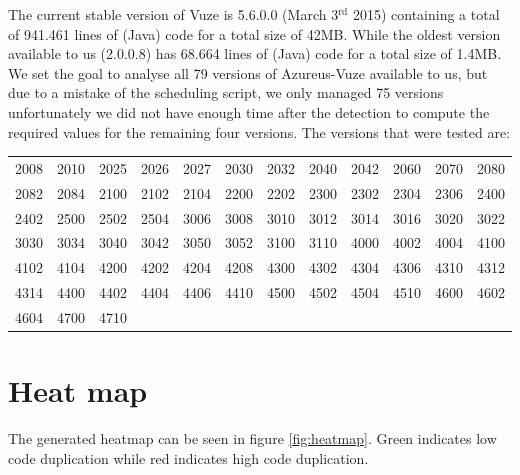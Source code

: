 \documentclass[a4paper,twoside,11pt]{article}
\begin{document}
The current stable version of {\sc Vuze} is 5.6.0.0 (March 3$^{\text{rd}}$ 2015) containing a total of 941.461 lines of (Java) code for a total size of 42MB. While the oldest version available to us (2.0.0.8) has 68.664 lines of (Java) code for a total size of 1.4MB. \\

We set the goal to analyse all 79 versions of {\sc Azureus-Vuze} available to us, but due to a mistake of the scheduling script, we only managed 75 versions unfortunately we did not have enough time after the detection to compute the required values for the remaining four versions. The versions that were tested are: \\

\begin{tabular}{cccccccccccc}
2008 & 2010 & 2025 & 2026 & 2027 & 2030 & 2032 & 2040 & 2042 & 2060 & 2070 & 2080 \\
2082 & 2084 & 2100 & 2102 & 2104 & 2200 & 2202 & 2300 & 2302 & 2304 & 2306 & 2400 \\
2402 & 2500 & 2502 & 2504 & 3006 & 3008 & 3010 & 3012 & 3014 & 3016 & 3020 & 3022 \\
3030 & 3034 & 3040 & 3042 & 3050 & 3052 & 3100 & 3110 & 4000 & 4002 & 4004 & 4100 \\
4102 & 4104 & 4200 & 4202 & 4204 & 4208 & 4300 & 4302 & 4304 & 4306 & 4310 & 4312 \\
4314 & 4400 & 4402 & 4404 & 4406 & 4410 & 4500 & 4502 & 4504 & 4510 & 4600 & 4602 \\
4604 & 4700 & 4710 &      &      &      &      &      &      &      &      &      \\
\end{tabular}


\section{Heat map}
\label{sec:heatmap}
The generated heatmap can be seen in figure \ref{fig:heatmap}. Green indicates low code duplication while red indicates high code duplication. \\
\end{document}
